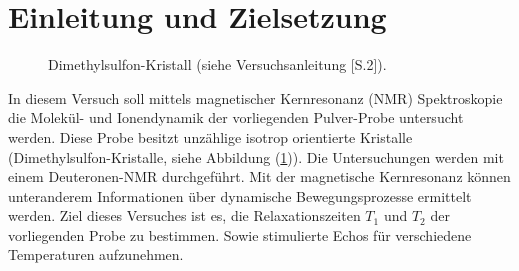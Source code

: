 \section{Einleitung und Zielsetzung}
\begin{figure}
	\centering
	\vspace{-10pt}
	\caption{Di{\-}me{\-}thyl{\-}sul{\-}fon-Kristall (siehe Versuchsanleitung \cite{Anleitung}[S.2]).}
	\label{probe}
\end{figure}
In diesem Versuch soll mittels magnetischer Kernresonanz (NMR) Spektroskopie die Molek\"{u}l- und Ionendynamik der vorliegenden Pulver-Probe untersucht werden.
Diese Probe besitzt unz\"{a}hlige isotrop orientierte Kristalle (Dimethylsulfon-Kristalle, siehe Abbildung (\ref{probe})).
Die Untersuchungen werden mit einem Deuteronen-NMR durchgef\"{u}hrt.
Mit der magnetische Kernresonanz k\"{o}nnen unteranderem Informationen \"{u}ber dynamische Bewegungspro{\-}zesse ermittelt werden.
Ziel dieses Versuches ist es, die Relaxationszeiten $T_1$ und $T_2$ der vorliegenden Probe zu bestimmen.
Sowie stimulierte Echos f\"{u}r verschiedene Temperaturen aufzunehmen.
